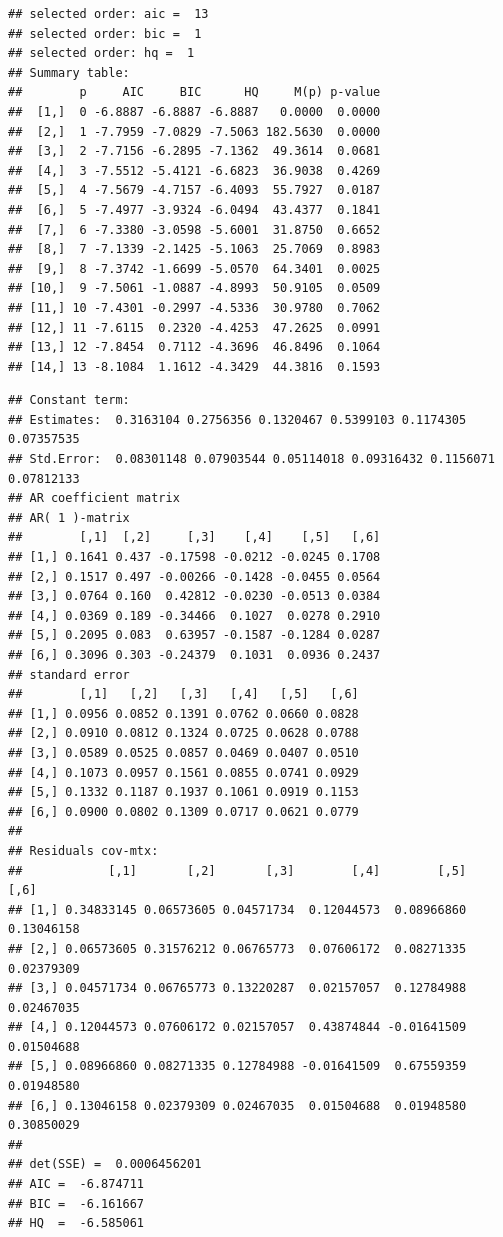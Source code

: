\documentclass[]{article}
\begin{document}
\begin{verbatim}
## selected order: aic =  13 
## selected order: bic =  1 
## selected order: hq =  1 
## Summary table:  
##        p     AIC     BIC      HQ     M(p) p-value
##  [1,]  0 -6.8887 -6.8887 -6.8887   0.0000  0.0000
##  [2,]  1 -7.7959 -7.0829 -7.5063 182.5630  0.0000
##  [3,]  2 -7.7156 -6.2895 -7.1362  49.3614  0.0681
##  [4,]  3 -7.5512 -5.4121 -6.6823  36.9038  0.4269
##  [5,]  4 -7.5679 -4.7157 -6.4093  55.7927  0.0187
##  [6,]  5 -7.4977 -3.9324 -6.0494  43.4377  0.1841
##  [7,]  6 -7.3380 -3.0598 -5.6001  31.8750  0.6652
##  [8,]  7 -7.1339 -2.1425 -5.1063  25.7069  0.8983
##  [9,]  8 -7.3742 -1.6699 -5.0570  64.3401  0.0025
## [10,]  9 -7.5061 -1.0887 -4.8993  50.9105  0.0509
## [11,] 10 -7.4301 -0.2997 -4.5336  30.9780  0.7062
## [12,] 11 -7.6115  0.2320 -4.4253  47.2625  0.0991
## [13,] 12 -7.8454  0.7112 -4.3696  46.8496  0.1064
## [14,] 13 -8.1084  1.1612 -4.3429  44.3816  0.1593
\end{verbatim}

\begin{verbatim}
## Constant term: 
## Estimates:  0.3163104 0.2756356 0.1320467 0.5399103 0.1174305 0.07357535 
## Std.Error:  0.08301148 0.07903544 0.05114018 0.09316432 0.1156071 0.07812133 
## AR coefficient matrix 
## AR( 1 )-matrix 
##        [,1]  [,2]     [,3]    [,4]    [,5]   [,6]
## [1,] 0.1641 0.437 -0.17598 -0.0212 -0.0245 0.1708
## [2,] 0.1517 0.497 -0.00266 -0.1428 -0.0455 0.0564
## [3,] 0.0764 0.160  0.42812 -0.0230 -0.0513 0.0384
## [4,] 0.0369 0.189 -0.34466  0.1027  0.0278 0.2910
## [5,] 0.2095 0.083  0.63957 -0.1587 -0.1284 0.0287
## [6,] 0.3096 0.303 -0.24379  0.1031  0.0936 0.2437
## standard error 
##        [,1]   [,2]   [,3]   [,4]   [,5]   [,6]
## [1,] 0.0956 0.0852 0.1391 0.0762 0.0660 0.0828
## [2,] 0.0910 0.0812 0.1324 0.0725 0.0628 0.0788
## [3,] 0.0589 0.0525 0.0857 0.0469 0.0407 0.0510
## [4,] 0.1073 0.0957 0.1561 0.0855 0.0741 0.0929
## [5,] 0.1332 0.1187 0.1937 0.1061 0.0919 0.1153
## [6,] 0.0900 0.0802 0.1309 0.0717 0.0621 0.0779
##   
## Residuals cov-mtx: 
##            [,1]       [,2]       [,3]        [,4]        [,5]       [,6]
## [1,] 0.34833145 0.06573605 0.04571734  0.12044573  0.08966860 0.13046158
## [2,] 0.06573605 0.31576212 0.06765773  0.07606172  0.08271335 0.02379309
## [3,] 0.04571734 0.06765773 0.13220287  0.02157057  0.12784988 0.02467035
## [4,] 0.12044573 0.07606172 0.02157057  0.43874844 -0.01641509 0.01504688
## [5,] 0.08966860 0.08271335 0.12784988 -0.01641509  0.67559359 0.01948580
## [6,] 0.13046158 0.02379309 0.02467035  0.01504688  0.01948580 0.30850029
##   
## det(SSE) =  0.0006456201 
## AIC =  -6.874711 
## BIC =  -6.161667 
## HQ  =  -6.585061
\end{verbatim}
\end{document}
